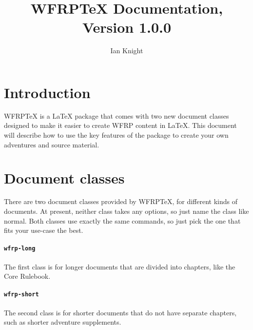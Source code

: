 \documentclass[10pt,a4paper]{article}
\title{WFRP\TeX{} Documentation, Version 1.0.0}
\author{Ian Knight}
\date{}
\begin{document}
\maketitle

\section{Introduction}
WFRP\TeX{} is a \LaTeX{} package that comes with two new document classes
designed to make it easier to create WFRP content in \LaTeX{}. This document
will describe how to use the key features of the package to create your
own adventures and source material.

\section{Document classes}
There are two document classes provided by WFRP\TeX{}, for different kinds
of documents. At present, neither class takes any options, so just name the
class like normal. Both classes use exactly the same commands, so just pick
the one that fits your use-case the best.

\paragraph{\texttt{wfrp-long}} The first class is for longer documents that
are divided into chapters, like the Core Rulebook.

\paragraph{\texttt{wfrp-short}} The second class is for shorter documents
that do not have separate chapters, such as shorter adventure supplements.
\end{document}

